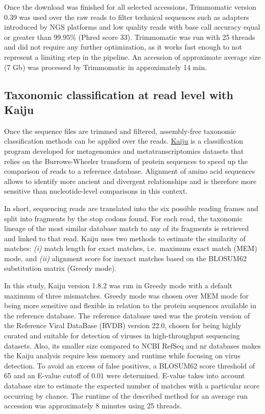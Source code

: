 \documentclass[
  openany]{book}
\begin{document}
Once the download was finished for all selected accessions, Trimmomatic \autocite{Bolger2014} version 0.39 was used over the raw reads to filter technical sequences such as adapters introduced by NGS platforms and low quality reads with base call accuracy equal or greater than 99.95\% (Phred score 33). Trimmomatic was run with 25 threads and did not require any further optimization, as it works fast enough to not represent a limiting step in the pipeline. An accession of approximate average size (7 Gb) was processed by Trimmomatic in approximately 14 min.

\hypertarget{kaiju}{%
\subsection{Taxonomic classification at read level with Kaiju}\label{kaiju}}

Once the sequence files are trimmed and filtered, assembly-free taxonomic classification methods can be applied over the reads. \href{https://github.com/bioinformatics-centre/kaiju}{Kaiju} \autocite{Menzel2016} is a classification program developed for metagenomics and metatranscriptomics datasets that relies on the Burrows-Wheeler transform of protein sequences to speed up the comparison of reads to a reference database. Alignment of amino acid sequences allows to identify more ancient and divergent relationships and is therefore more sensitive than nucleotide-level comparisons in this context.

In short, sequencing reads are translated into the six possible reading frames and split into fragments by the stop codons found. For each read, the taxonomic lineage of the most similar database match to any of its fragments is retrieved and linked to that read. Kaiju uses two methods to estimate the similarity of matches: \emph{(i)} match length for exact matches, i.e.~maximum exact match (MEM) mode, and \emph{(ii)} alignment score for inexact matches based on the BLOSUM62 substitution matrix (Greedy mode).

In this study, Kaiju version 1.8.2 was run in Greedy mode with a default maximum of three mismatches. Greedy mode was chosen over MEM mode for being more sensitive and flexible in relation to the protein sequences available in the reference database. The reference database used was the protein version of the Reference Viral DataBase (RVDB) \autocite{Bigot2020} version 22.0, chosen for being highly curated and suitable for detection of viruses in high-throughput sequencing datasets. Also, its smaller size compared to NCBI RefSeq and nr databases makes the Kaiju analysis require less memory and runtime while focusing on virus detection. To avoid an excess of false positives, a BLOSUM62 score threshold of 65 and an E-value cutoff of \(0.01\) were determined. E-value takes into account database size to estimate the expected number of matches with a particular score occurring by chance. The runtime of the described method for an average run accession was approximately 8 minutes using 25 threads.
\end{document}
